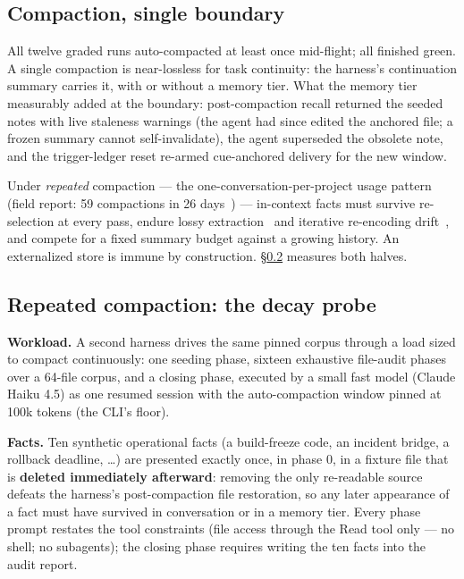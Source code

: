 \documentclass[11pt]{article}
\begin{document}
\subsection{Compaction, single boundary}
\label{sec:singleboundary}

All twelve graded runs auto-compacted at least once mid-flight; all
finished green. A single compaction is near-lossless for task continuity:
the harness's continuation summary carries it, with or without a memory
tier. What the memory tier measurably added at the boundary:
post-compaction recall returned the seeded notes with live staleness
warnings (the agent had since edited the anchored file; a frozen
summary cannot self-invalidate), the agent superseded the obsolete
note, and the trigger-ledger reset re-armed cue-anchored delivery for
the new window.

Under \emph{repeated} compaction --- the one-conversation-per-project usage
pattern (field report: 59 compactions in 26 days~\cite{fieldreport}) --- in-context
facts must survive re-selection at every pass, endure lossy
extraction~\cite{proactivemem,recmem} and iterative re-encoding drift~\cite{ssgm,recursummary}, and compete
for a fixed summary budget against a growing history. An externalized store is immune by
construction. \S\ref{sec:decay} measures both halves.

\subsection{Repeated compaction: the decay probe}
\label{sec:decay}

\textbf{Workload.} A second harness drives the same pinned corpus through a
load sized to compact continuously: one seeding phase, sixteen
exhaustive file-audit phases over a 64-file corpus, and a closing
phase, executed by a small fast model (Claude Haiku 4.5) as one
resumed session with the auto-compaction window pinned at 100k tokens
(the CLI's floor).

\textbf{Facts.} Ten synthetic operational facts (a build-freeze code, an
incident bridge, a rollback deadline, \ldots) are presented exactly once,
in phase 0, in a fixture file that is \textbf{deleted immediately
afterward}: removing the only re-readable source defeats the
harness's post-compaction file restoration, so any later appearance of
a fact must have survived in conversation or in a memory tier. Every
phase prompt restates the tool constraints (file access through the
Read tool only --- no shell; no subagents); the closing phase requires
writing the ten facts into the audit report.
\end{document}
